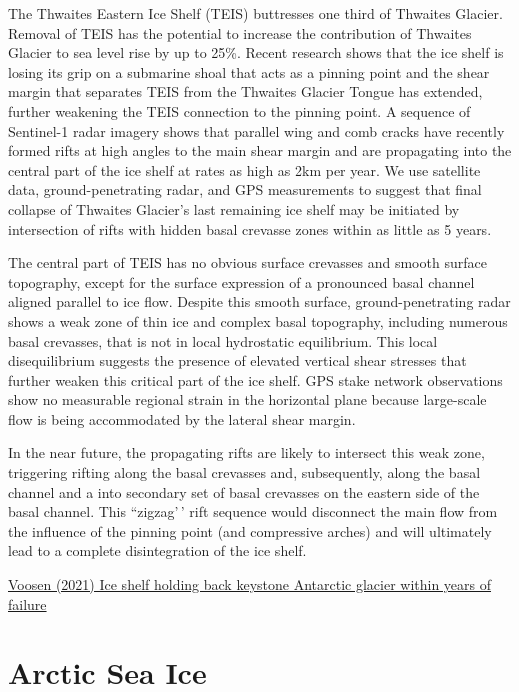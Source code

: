 \documentclass[
]{book}
\begin{document}
The Thwaites Eastern Ice Shelf (TEIS) buttresses one third of Thwaites Glacier. Removal of TEIS has the potential to increase the contribution of Thwaites Glacier to sea level rise by up to 25\%. Recent research shows that the ice shelf is losing its grip on a submarine shoal that acts as a pinning point and the shear margin that separates TEIS from the Thwaites Glacier Tongue has extended, further weakening the TEIS connection to the pinning point. A sequence of Sentinel-1 radar imagery shows that parallel wing and comb cracks have recently formed rifts at high angles to the main shear margin and are propagating into the central part of the ice shelf at rates as high as 2km per year. We use satellite data, ground-penetrating radar, and GPS measurements to suggest that final collapse of Thwaites Glacier's last remaining ice shelf may be initiated by intersection of rifts with hidden basal crevasse zones within as little as 5 years.

The central part of TEIS has no obvious surface crevasses and smooth surface topography, except for the surface expression of a pronounced basal channel aligned parallel to ice flow. Despite this smooth surface, ground-penetrating radar shows a weak zone of thin ice and complex basal topography, including numerous basal crevasses, that is not in local hydrostatic equilibrium. This local disequilibrium suggests the presence of elevated vertical shear stresses that further weaken this critical part of the ice shelf. GPS stake network observations show no measurable regional strain in the horizontal plane because large-scale flow is being accommodated by the lateral shear margin.

In the near future, the propagating rifts are likely to intersect this weak zone, triggering rifting along the basal crevasses and, subsequently, along the basal channel and a into secondary set of basal crevasses on the eastern side of the basal channel. This ``zigzag'\,' rift sequence would disconnect the main flow from the influence of the pinning point (and compressive arches) and will ultimately lead to a complete disintegration of the ice shelf.

\href{https://www.science.org/content/article/ice-shelf-holding-back-keystone-antarctic-glacier-within-years-failure}{Voosen (2021) Ice shelf holding back keystone Antarctic glacier within years of failure}

\hypertarget{arctic-sea-ice}{%
\section{Arctic Sea Ice}\label{arctic-sea-ice}}
\end{document}
